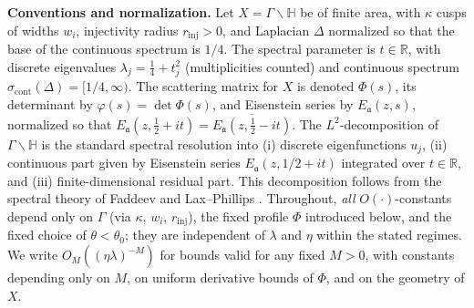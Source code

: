 \medskip
\noindent\textbf{Conventions and normalization.}
Let $X=\Gamma\backslash\mathbb{H}$ be of finite area, with $\kappa$ cusps of widths $w_i$, injectivity radius $r_{\mathrm{inj}}>0$, and Laplacian $\Delta$ normalized so that the base of the continuous spectrum is $1/4$. The spectral parameter is $t\in\mathbb{R}$, with discrete eigenvalues $\lambda_j=\tfrac14+t_j^2$ (multiplicities counted) and continuous spectrum $\sigma_{\mathrm{cont}}(\Delta)=[1/4,\infty)$. The scattering matrix for $X$ is denoted $\Phi(s)$, its determinant by $\varphi(s)=\det\Phi(s)$, and Eisenstein series by $E_\mathfrak{a}(z,s)$, normalized so that $E_\mathfrak{a}(z,\tfrac12+it)=\overline{E_\mathfrak{a}(z,\tfrac12-it)}$. The $L^2$-decomposition of $\Gamma\backslash\mathbb{H}$ is the standard spectral resolution into (i) discrete eigenfunctions $u_j$, (ii) continuous part given by Eisenstein series $E_\mathfrak{a}(z,1/2+it)$ integrated over $t\in\mathbb{R}$, and (iii) finite-dimensional residual part. This decomposition follows from the spectral theory of Faddeev \cite{Faddeev1967} and Lax--Phillips \cite{LaxPhillips1976}. Throughout, \emph{all} $O(\cdot)$-constants depend only on $\Gamma$ (via $\kappa$, ${w_i}$, $r_{\mathrm{inj}}$), the fixed profile $\Phi$ introduced below, and the fixed choice of $\theta<\theta_0$; they are independent of $\lambda$ and $\eta$ within the stated regimes. We write $O_M((\eta\lambda)^{-M})$ for bounds valid for any fixed $M>0$, with constants depending only on $M$, on uniform derivative bounds of $\Phi$, and on the geometry of $X$.

